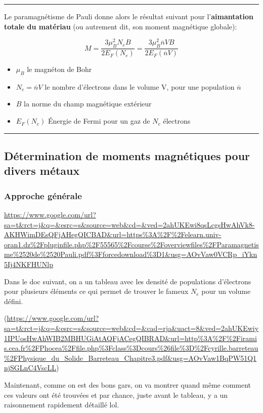 \documentclass{report}
\begin{document}
\rule{\textwidth}{0.4pt}
\begin{center}
Le paramagnétisme de Pauli donne alors le résultat suivant pour l'\textbf{aimantation totale du matériau} (ou autrement dit, son moment magnétique globale):

$$M = \frac{3\mu_B^2 N_e B}{2 E_F(N_e)} = \frac{3\mu_B^2 \overline{n} V B}{2 E_F(\overline{n} V)}$$

\begin{itemize}
    \item $\mu_B$ le magnéton de Bohr
    \item $N_e = \overline{n} V$ le nombre d'électrons dans le volume V, pour une population $\overline{n}$
    \item $B$ la norme du champ magnétique extérieur
    \item $E_F(N_e)$ Énergie de Fermi pour un gaz de $N_e$ électrons
\end{itemize}    
\end{center}

\rule{\textwidth}{0.4pt}
\subsection{Détermination de moments magnétiques pour divers métaux}
\subsubsection{Approche générale}
\url{https://www.google.com/url?sa=t&rct=j&q=&esrc=s&source=web&cd=&ved=2ahUKEwi8qsLcgsHwAhVk8-AKHWimDEsQFjAHegQICBAD&url=https%3A%2F%2Felearn.univ-oran1.dz%2Fpluginfile.php%2F55565%2Fcourse%2Foverviewfiles%2FParamagnetisme%2520de%2520Pauli.pdf%3Fforcedownload%3D1&usg=AOvVaw0VCRp_iYkn5Ij4NKFHUNlp}

Dans le doc suivant, on a un tableau avec les densité de populations d'électrons pour plusieurs éléments ce qui permet de trouver le fameux $N_e$ pour un volume défini.

(\url{https://www.google.com/url?sa=t&rct=j&q=&esrc=s&source=web&cd=&cad=rja&uact=8&ved=2ahUKEwiy1IPUosHwAhWIB2MBHUGiAtAQFjACegQIBRAD&url=http%3A%2F%2Firamis.cea.fr%2FPhocea%2Ffile.php%3Fclass%3Dcours%26file%3D%2Fcyrille.barreteau%2FPhysique_du_Solide_Barreteau_Chapitre3.pdf&usg=AOvVaw1BqPW51Q1njSGLnC4VscLL})

Maintenant, comme on est des bons gars, on va montrer quand même comment ces valeurs ont été trouvées et par chance, juste avant le tableau, y a un raisonnement rapidement détaillé lol.
\end{document}
